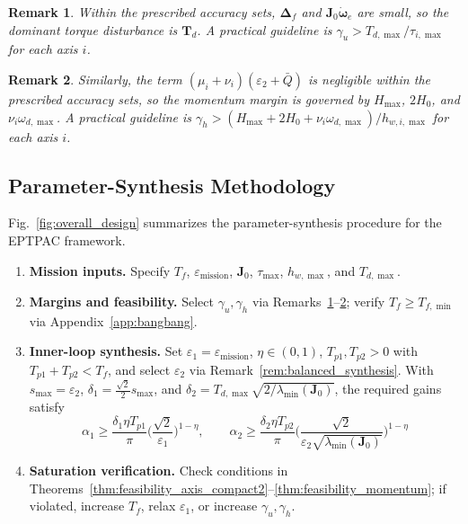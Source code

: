 \documentclass[journal]{new-aiaa}
\newtheorem{remark}{Remark}
\begin{document}
\begin{remark}
\label{rem:gamma_u_selection}
Within the prescribed accuracy sets, $\boldsymbol{\Delta}_f$ and $\boldsymbol{J}_0\dot{\boldsymbol{\omega}}_e$
are small, so the dominant torque disturbance is $\boldsymbol{T}_d$.
A practical guideline is $\gamma_u > T_{d,\max} / \tau_{i,\max}$ for each axis $i$.
\end{remark}

\begin{remark}
\label{rem:gamma_h_selection}
Similarly, the term $(\mu_i+\nu_i)(\varepsilon_2+\bar Q)$ is negligible within the prescribed accuracy sets,
so the momentum margin is governed by $H_{\max}$, $2H_0$, and $\nu_i\omega_{d,\max}$.
A practical guideline is
$\gamma_h > (H_{\max} + 2H_0 + \nu_i\omega_{d,\max})/h_{w,i,\max}$ for each axis $i$.
\end{remark}


\subsection{Parameter-Synthesis Methodology}
\label{overall_design}

Fig.~\ref{fig:overall_design} summarizes the parameter-synthesis procedure for the EPTPAC framework.

\begin{enumerate}
\item \textbf{Mission inputs.}
Specify $T_f$, $\varepsilon_{\mathrm{mission}}$, $\boldsymbol{J}_0$, $\tau_{\max}$, $h_{w,\max}$, and $T_{d,\max}$.

\item \textbf{Margins and feasibility.}
Select $\gamma_u,\gamma_h$ via Remarks~\ref{rem:gamma_u_selection}--\ref{rem:gamma_h_selection};
verify $T_f\ge T_{f,\min}$ via Appendix~\ref{app:bangbang}.

\item \textbf{Inner-loop synthesis.}
Set $\varepsilon_1=\varepsilon_{\mathrm{mission}}$, $\eta\in(0,1)$, $T_{p1},T_{p2}>0$ with $T_{p1}+T_{p2}<T_f$,
and select $\varepsilon_2$ via Remark~\ref{rem:balanced_synthesis}.
With $s_{\max}=\varepsilon_2$, $\delta_1=\frac{\sqrt{2}}{2}s_{\max}$, and $\delta_2=T_{d,\max}\sqrt{2/\lambda_{\min}(\boldsymbol{J}_0)}$,
the required gains satisfy
\begin{equation}
\alpha_1 \ge \frac{\delta_1\eta T_{p1}}{\pi}\Big(\frac{\sqrt{2}}{\varepsilon_1}\Big)^{1-\eta},\qquad
\alpha_2 \ge \frac{\delta_2\eta T_{p2}}{\pi}\Big(\frac{\sqrt{2}}{\varepsilon_2\sqrt{\lambda_{\min}(\boldsymbol{J}_0)}}\Big)^{1-\eta}
\label{eq:alpha_min_short}
\end{equation}

\item \textbf{Saturation verification.}
Check conditions in Theorems~\ref{thm:feasibility_axis_compact2}--\ref{thm:feasibility_momentum};
if violated, increase $T_f$, relax $\varepsilon_1$, or increase $\gamma_u,\gamma_h$.
\end{enumerate}
\end{document}
